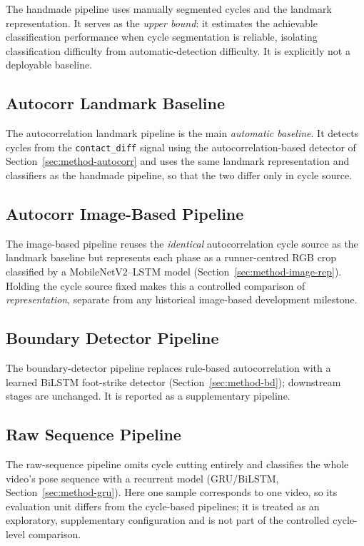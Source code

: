 The handmade pipeline uses manually segmented cycles and the landmark
representation. It serves as the \emph{upper bound}: it estimates the achievable
classification performance when cycle segmentation is reliable, isolating
classification difficulty from automatic-detection difficulty. It is
explicitly not a deployable baseline.

\subsection{Autocorr Landmark Baseline}
\label{sec:setup-autocorr}

The autocorrelation landmark pipeline is the main \emph{automatic baseline}. It
detects cycles from the \texttt{contact\_diff} signal using the
autocorrelation-based detector of Section~\ref{sec:method-autocorr} and uses the
same landmark representation and classifiers as the handmade pipeline, so that
the two differ only in cycle source.

\subsection{Autocorr Image-Based Pipeline}
\label{sec:setup-image}

The image-based pipeline reuses the \emph{identical} autocorrelation cycle
source as the landmark baseline but represents each phase as a runner-centred
RGB crop classified by a MobileNetV2--LSTM model
(Section~\ref{sec:method-image-rep}). Holding the cycle source fixed makes this
a controlled comparison of \emph{representation}, separate from any historical
image-based development milestone.

\subsection{Boundary Detector Pipeline}
\label{sec:setup-bd}

The boundary-detector pipeline replaces rule-based autocorrelation with a
learned BiLSTM foot-strike detector (Section~\ref{sec:method-bd}); downstream
stages are unchanged. It is reported as a supplementary pipeline.

\subsection{Raw Sequence Pipeline}
\label{sec:setup-raw}

The raw-sequence pipeline omits cycle cutting entirely and classifies the whole
video's pose sequence with a recurrent model (GRU/BiLSTM,
Section~\ref{sec:method-gru}). Here one sample corresponds to one video, so its
evaluation unit differs from the cycle-based pipelines; it is treated as an
exploratory, supplementary configuration and is not part of the controlled
cycle-level comparison.

